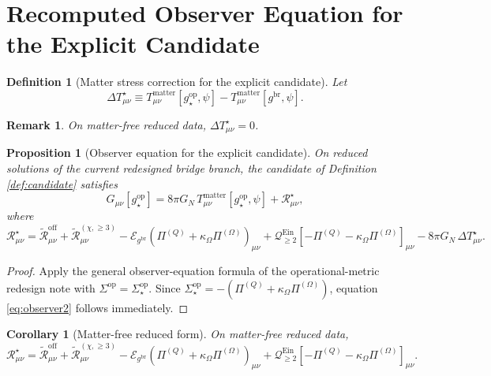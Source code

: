 \documentclass[11pt]{article}
\newcommand{\ReBridge}{g^{\mathrm{br}}}
\newcommand{\OpMetricStar}{g^{\mathrm{op}}_\star}
\newcommand{\PiQ}{\Pi^{(Q)}}
\newcommand{\PiOmega}{\Pi^{(\Omega)}}
\newcommand{\SigmaOp}{\Sigma^{\mathrm{op}}}
\newcommand{\SigmaOpStar}{\Sigma^{\mathrm{op}}_\star}
\newcommand{\ReOff}{\widetilde{\mathcal R}_{\mu\nu}^{\mathrm{off}}}
\newcommand{\ReLong}{\widetilde{\mathcal R}_{\mu\nu}^{(\chi,\ge 3)}}
\newcommand{\DeltaTStar}{\Delta T_{\mu\nu}^{\star}}
\newcommand{\EinLin}{\mathcal E_{\ReBridge}}
\newcommand{\EinQuad}{\mathcal Q_{\ge 2}^{\mathrm{Ein}}}
\newtheorem{definition}{Definition}
\newtheorem{proposition}{Proposition}
\newtheorem{remark}{Remark}
\newtheorem{corollary}{Corollary}
\begin{document}
\section{Recomputed Observer Equation for the Explicit Candidate}

\begin{definition}[Matter stress correction for the explicit candidate]
\label{def:deltat}
Let
\begin{equation}
\DeltaTStar
\equiv
T_{\mu\nu}^{\mathrm{matter}}[\OpMetricStar,\psi]
-T_{\mu\nu}^{\mathrm{matter}}[\ReBridge,\psi].
\label{eq:deltat}
\end{equation}
\end{definition}

\begin{remark}
On matter-free reduced data, \(\DeltaTStar=0\).
\end{remark}

\begin{proposition}[Observer equation for the explicit candidate]
\label{prop:observer}
On reduced solutions of the current redesigned bridge branch, the candidate of Definition \ref{def:candidate} satisfies
\begin{equation}
G_{\mu\nu}[\OpMetricStar]
=
8\pi G_N\,T_{\mu\nu}^{\mathrm{matter}}[\OpMetricStar,\psi]
+\mathcal R_{\mu\nu}^{\star},
\label{eq:observer}
\end{equation}
where
\begin{equation}
\mathcal R_{\mu\nu}^{\star}
=
\ReOff+\ReLong
-\EinLin(\PiQ+\kappa_\Omega\PiOmega)_{\mu\nu}
+\EinQuad[-\PiQ-\kappa_\Omega\PiOmega]_{\mu\nu}
-8\pi G_N\,\DeltaTStar.
\label{eq:observer2}
\end{equation}
\end{proposition}

\begin{proof}
Apply the general observer-equation formula of the operational-metric redesign note with \(\SigmaOp=\SigmaOpStar\). Since \(\SigmaOpStar=-(\PiQ+\kappa_\Omega\PiOmega)\), equation \eqref{eq:observer2} follows immediately.
\end{proof}

\begin{corollary}[Matter-free reduced form]
\label{cor:matterfree}
On matter-free reduced data,
\begin{equation}
\mathcal R_{\mu\nu}^{\star}
=
\ReOff+\ReLong
-\EinLin(\PiQ+\kappa_\Omega\PiOmega)_{\mu\nu}
+\EinQuad[-\PiQ-\kappa_\Omega\PiOmega]_{\mu\nu}.
\label{eq:matterfree}
\end{equation}
\end{corollary}
\end{document}
